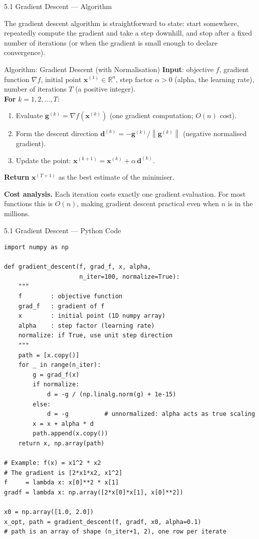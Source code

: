 \documentclass[aspectratio=169,10pt]{beamer}
\newcommand{\vx}{\mathbf{x}}
\newcommand{\vg}{\mathbf{g}}
\newcommand{\vd}{\mathbf{d}}
\newcommand{\R}{\mathbb{R}}
\newcommand{\norm}[1]{\left\|#1\right\|}
\begin{document}
\begin{frame}[allowframebreaks]{5.1 Gradient Descent --- Algorithm}

  The gradient descent algorithm is straightforward to state:
  start somewhere, repeatedly compute the gradient and take a
  step downhill, and stop after a fixed number of iterations
  (or when the gradient is small enough to declare convergence).

  \begin{block}{Algorithm: Gradient Descent (with Normalisation)}
    \textbf{Input}: objective $f$, gradient function $\nabla f$,
    initial point $\vx^{(1)} \in \R^n$,
    step factor $\alpha > 0$ (alpha, the learning rate),
    number of iterations $T$ (a positive integer).\\[4pt]
    \textbf{For} $k = 1, 2, \dots, T$:
    \begin{enumerate}
      \item Evaluate $\vg^{(k)} = \nabla f(\vx^{(k)})$
            (one gradient computation; $O(n)$ cost).
      \item Form the descent direction
            $\vd^{(k)} = -\vg^{(k)}/\norm{\vg^{(k)}}$
            (negative normalised gradient).
      \item Update the point:
            $\vx^{(k+1)} = \vx^{(k)} + \alpha\,\vd^{(k)}$.
    \end{enumerate}
    \textbf{Return} $\vx^{(T+1)}$ as the best estimate of the
    minimiser.
  \end{block}

  \textbf{Cost analysis.}  Each iteration costs exactly one
  gradient evaluation.  For most functions this is $O(n)$,
  making gradient descent practical even when $n$ is in the
  millions.

\end{frame}

\begin{frame}[fragile]{5.1 Gradient Descent --- Python Code}
\begin{lstlisting}[caption={Gradient Descent (Python/NumPy)}]
import numpy as np

def gradient_descent(f, grad_f, x, alpha,
                     n_iter=100, normalize=True):
    """
    f        : objective function
    grad_f   : gradient of f
    x        : initial point (1D numpy array)
    alpha    : step factor (learning rate)
    normalize: if True, use unit step direction
    """
    path = [x.copy()]
    for _ in range(n_iter):
        g = grad_f(x)
        if normalize:
            d = -g / (np.linalg.norm(g) + 1e-15)
        else:
            d = -g          # unnormalized: alpha acts as true scaling
        x = x + alpha * d
        path.append(x.copy())
    return x, np.array(path)

# Example: f(x) = x1^2 * x2
# The gradient is [2*x1*x2, x1^2]
f     = lambda x: x[0]**2 * x[1]
gradf = lambda x: np.array([2*x[0]*x[1], x[0]**2])

x0 = np.array([1.0, 2.0])
x_opt, path = gradient_descent(f, gradf, x0, alpha=0.1)
# path is an array of shape (n_iter+1, 2), one row per iterate
\end{lstlisting}
\end{frame}
\end{document}
